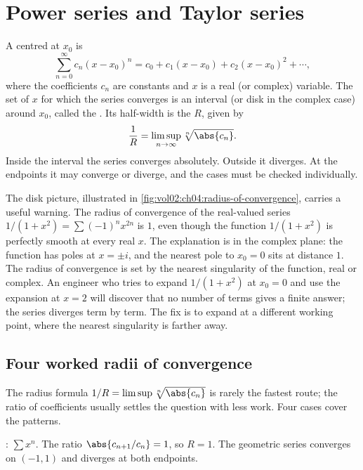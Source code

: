 \section{Power series and Taylor series}

A  centred at $x_{0}$ is
\[
\sum_{n=0}^{\infty} c_{n} (x - x_{0})^{n} = c_{0} + c_{1} (x - x_{0})
+ c_{2} (x - x_{0})^{2} + \cdots,
\]
where the coefficients $c_{n}$ are constants and $x$ is a real (or
complex) variable. The set of $x$ for which the series converges is an
interval (or disk in the complex case) around $x_{0}$, called the
. Its half-width is the
 $R$, given by
\[
\frac{1}{R} = \limsup_{n \to \infty} \sqrt[n]{\abs{c_{n}}}.
\]
Inside the interval the series converges absolutely. Outside it
diverges. At the endpoints it may converge or diverge, and the cases
must be checked individually.



The disk picture, illustrated in
\autoref{fig:vol02:ch04:radius-of-convergence}, carries a useful
warning. The radius of convergence of the real-valued series
$1/(1 + x^{2}) = \sum (-1)^{n} x^{2n}$ is $1$, even though the
function $1/(1 + x^{2})$ is perfectly smooth at every real $x$. The
explanation is in the complex plane: the function has poles at
$x = \pm i$, and the nearest pole to $x_{0} = 0$ sits at distance
$1$. The radius of convergence is set by the nearest singularity of
the function, real or complex. An engineer who tries to expand
$1/(1 + x^{2})$ at $x_{0} = 0$ and use the expansion at $x = 2$
will discover that no number of terms gives a finite answer; the
series diverges term by term. The fix is to expand at a different
working point, where the nearest singularity is farther away.

\subsection{Four worked radii of convergence}

The radius formula $1/R = \limsup \sqrt[n]{\abs{c_{n}}}$ is rarely the
fastest route; the ratio of coefficients usually settles the question
with less work. Four cases cover the patterns.

: $\sum x^{n}$. The ratio
$\abs{c_{n+1}/c_{n}} = 1$, so $R = 1$. The geometric series converges
on $(-1, 1)$ and diverges at both endpoints.

